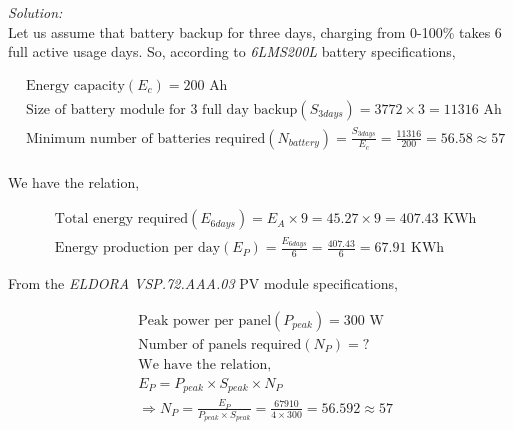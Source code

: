 \documentclass{home_assignment}
\begin{document}
\textit{Solution:}\\
Let us assume that battery backup for three days, charging from 0-100\% takes 6 full active usage days. So, according to \textit{6LMS200L} battery specifications,
\begin{fleqn}[\parindent]
  \begin{equation*}
     \begin{split}
      &\text{Energy capacity} (E_c)=200 \text{ Ah}\\
      &\text{Size of battery module for 3 full day backup} (S_{3days})=3772\times3 = 11316\text{ Ah}\\
      &\text{Minimum number of batteries required} (N_{battery})=\frac{S_{3days}}{E_c} =\frac{11316}{200}=56.58\approx57\\
        \end{split}
     \end{equation*}
\end{fleqn}
We have the relation,
\begin{fleqn}[\parindent]
  \begin{equation*}
     \begin{split}
      &\text{Total energy required} (E_{6days})= E_A\times9 = 45.27\times9=407.43\text{ KWh}\\
      &\text{Energy production per day} (E_{P})=\frac{E_{6days}}{6}=\frac{407.43}{6}=67.91 \text{ KWh}
        \end{split}
     \end{equation*}
\end{fleqn}
From the \textit{ELDORA VSP.72.AAA.03} PV module specifications,
\begin{fleqn}[\parindent]
    \begin{equation*}
       \begin{split}
        &\text{Peak power per panel} (P_{peak})= 300 \text{ W}\\
        &\text{Number of panels required} (N_P)= \text{?}\\
        &\text{We have the relation,}\\
        &E_{P}=P_{peak}\times S_{peak}\times N_P\\
        &\Rightarrow N_P=\frac{E_P}{P_{peak}\times S_{peak}}=\frac{67910}{4\times 300}=56.592\approx 57
         \end{split}
       \end{equation*}
      \end{fleqn}
\end{document}
